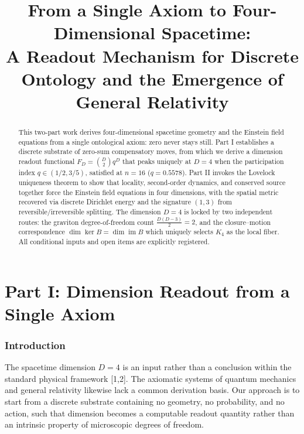 \documentclass[
  11pt,
]{article}
\author{}
\date{}
\begin{document}
\title{From a Single Axiom to Four-Dimensional Spacetime:\\
A Readout Mechanism for Discrete Ontology and the Emergence of General Relativity}
\author{}
\date{}
\maketitle

\begin{abstract}
This two-part work derives four-dimensional spacetime geometry and the Einstein field equations from a single ontological axiom: zero never stays still. Part I establishes a discrete substrate of zero-sum compensatory moves, from which we derive a dimension readout functional \(F_D=\binom{D}{2}q^D\) that peaks uniquely at \(D=4\) when the participation index \(q\in(1/2,3/5)\), satisfied at \(n=16\) (\(q=0.5578\)). Part II invokes the Lovelock uniqueness theorem to show that locality, second-order dynamics, and conserved source together force the Einstein field equations in four dimensions, with the spatial metric recovered via discrete Dirichlet energy and the signature \((1,3)\) from reversible/irreversible splitting. The dimension \(D=4\) is locked by two independent routes: the graviton degree-of-freedom count \(\frac{D(D-3)}2=2\), and the closure--motion correspondence \(\dim\ker B=\dim\operatorname{im}B\) which uniquely selects \(K_4\) as the local fiber. All conditional inputs and open items are explicitly registered.
\end{abstract}

\tableofcontents
\newpage

\part{Part I: Dimension Readout from a Single Axiom}

\section{Introduction}\label{introduction}

The spacetime dimension \(D=4\) is an input rather than a conclusion
within the standard physical framework {[}1,2{]}. The axiomatic systems
of quantum mechanics and general relativity likewise lack a common
derivation basis. Our approach is to start from a discrete substrate
containing no geometry, no probability, and no action, such that
dimension becomes a computable readout quantity rather than an intrinsic
property of microscopic degrees of freedom.
\end{document}
